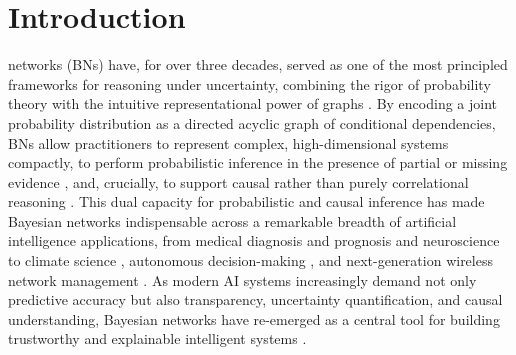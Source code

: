 \section{Introduction}\label{sec:intro}
 networks (BNs) have, for over three decades, served as one of the most principled frameworks for reasoning under uncertainty, combining the rigor of probability theory with the intuitive representational power of graphs \cite{geetha2023understanding}. By encoding a joint probability distribution as a directed acyclic graph of conditional dependencies, BNs allow practitioners to represent complex, high-dimensional systems compactly, to perform probabilistic inference in the presence of partial or missing evidence \cite{mohan2013graphical,franzin2016bnstruct}, and, crucially, to support causal rather than purely correlational reasoning \cite{gao2026bayesian}. This dual capacity for probabilistic and causal inference has made Bayesian networks indispensable across a remarkable breadth of artificial intelligence applications, from medical diagnosis and prognosis \cite{polotskaya2024bayesian,selvaraj2024artificial,zhang2026causald} and neuroscience \cite{bielza2014bayesian} to climate science \cite{ebertuphoff2012causal}, autonomous decision-making \cite{abdallah2025advancing}, and next-generation wireless network management \cite{shen2020assisted}. As modern AI systems increasingly demand not only predictive accuracy but also transparency, uncertainty quantification, and causal understanding, Bayesian networks have re-emerged as a central tool for building trustworthy and explainable intelligent systems \cite{zhang2026explainable,butz2022investigating}.

